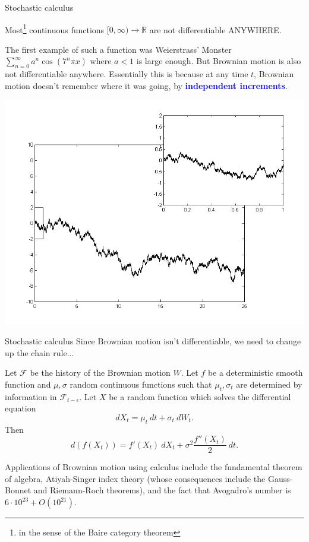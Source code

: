 \documentclass[10pt]{beamer}
\newcommand{\RR}{\mathbb{R}}
\newcommand{\attn}[1]{\textbf{\textcolor{blue}{#1}}}
\begin{document}
\begin{frame}{Stochastic calculus}
\begin{theorem}
Most\footnote{in the sense of the Baire category theorem} continuous functions $[0, \infty) \to \RR$ are not differentiable ANYWHERE.
\end{theorem}

The first example of such a function was Weierstrass' Monster $\sum_{n=0}^\infty a^n \cos(7^n \pi x)$
where $a < 1$ is large enough. But Brownian motion is also not differentiable anywhere.
Essentially this is because at any time $t$, Brownian motion doesn't remember where it was going, by \attn{independent increments}.

\begin{center}
\includegraphics[scale=0.25]{Wiener_process_zoom}
\end{center}
\end{frame}

\begin{frame}{Stochastic calculus}
Since Brownian motion isn't differentiable, we need to change up the chain rule...
\begin{theorem}
Let $\mathcal F$ be the history of the Brownian motion $W$.
Let $f$ be a deterministic smooth function and $\mu,\sigma$ random continuous functions such that $\mu_t,\sigma_t$ are determined by information in $\mathcal F_{t - \epsilon}$. Let $X$ be a random function which solves the differential equation
$$dX_t = \mu_t ~dt + \sigma_t ~dW_t.$$
Then
$$d(f(X_t)) = f'(X_t)~dX_t + \sigma^2 \frac{f''(X_t)}{2} ~dt.$$
\end{theorem}

Applications of Brownian motion using calculus include the fundamental theorem of algebra, Atiyah-Singer index theory (whose consequences include the Gauss-Bonnet and Riemann-Roch theorems), and the fact that Avogadro's number is $6 \cdot 10^{23} + O(10^{21})$.
\end{frame}
\end{document}
